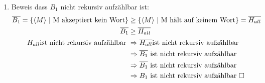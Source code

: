 \documentclass{article}
\begin{document}
\begin{enumerate} [label=(\alph*).]
\begin{enumerate}[label=\Roman*.]
\begin{enumerate}[label=]
					$\Rightarrow \langle M_{neu} \rangle \in A_{62}$\\
					$\Rightarrow f(w) \in A_{62}$
					\\\\	
					$w \notin H_{\epsilon} \Rightarrow$ M hält nicht auf $\epsilon$\\
					$\Rightarrow \langle M_{neu} \rangle$ hält auf keiner Eingabe\\
					$\Rightarrow \langle M_{neu} \rangle \notin A_{62}$\\
					$\Rightarrow f(w) \notin A_{62}$\\
					Daher ist $H_{\epsilon} \leq A_{62} \Rightarrow A_{62}$ ist nicht Rekursiv.  
				\end{enumerate}
			\item $A_{62}$ ist aufzählbar:\\
			Es gibt eine TM M die $A_{62}$ erkennt mit folgenden Eigenschaften:
			\begin{enumerate}[label=$\bullet$]
				\item M Simuliert alle Gödelnummern parallel. Also jeweils einen Schritt auf allen Nummern pro Iteration.
				\item Die Simulation funktioniert indem jeweils wieder ein Schritt auf jedem Wort mit l $\leq$ 62 Simuliert wird.
				\item Werden dabei zwei Wörter Akzeptiert "druckt" M die korrespondierende Gödelnummer.
			\end{enumerate}
			\end{enumerate}
			\item Beweis dass $B_1$ nicht rekursiv aufzählbar ist:
			\begin{equation*}
			\begin{aligned}
			\overline{B_1} = \{\langle M \rangle\textnormal{ | M akzeptiert kein Wort}\} &\geq
			\{\langle M \rangle\textnormal{ | M hält auf keinem Wort}\} = \overline{H_{all}}\\
			\overline{B_1} &\geq \overline{H_{all}}\\
			H_{all} \textnormal{ist nicht rekursiv aufzählbar } &\Rightarrow \overline{H_{all}}\textnormal{ist nicht rekursiv aufzählbar }\\
			&\Rightarrow \overline{B_1}\textnormal{ ist nicht rekursiv aufzählbar}\\
			&\Rightarrow \overline{B_1} \textnormal{ ist nicht rekursiv aufzählbar}\\
			&\Rightarrow B_1 \textnormal{ ist nicht rekursiv aufzählbar } \square
			\end{aligned}
			\end{equation*}
		\end{enumerate}
\end{document}
